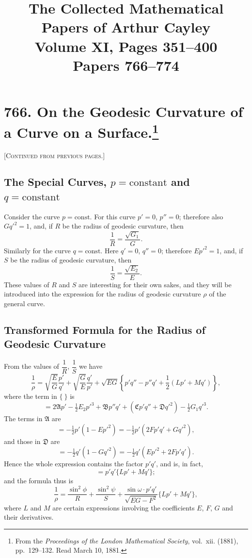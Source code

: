 \documentclass[11pt,a4paper]{article}
\title{\textbf{The Collected Mathematical Papers of Arthur Cayley}\\[6pt]
\large Volume XI, Pages 351--400\\[4pt]
\normalsize Papers 766--774}
\author{}
\date{}
\theoremstyle{definition}
\begin{document}
\maketitle
\thispagestyle{empty}

\tableofcontents
\newpage

\section[On the Geodesic Curvature of a Curve on a Surface]{766. On the Geodesic Curvature of a Curve on a Surface.\footnote{From the \textit{Proceedings of the London Mathematical Society}, vol.~xii. (1881), pp.~129--132. Read March 10, 1881.}}

\noindent\textsc{[Continued from previous pages.]}

\subsection*{The Special Curves, $p = \text{constant}$ and $q = \text{constant}$}

Consider the curve $p = \text{const}$. For this curve $p' = 0$, $p'' = 0$; therefore also $Gq'^2 = 1$, and, if $R$ be the radius of geodesic curvature, then
\[
\frac{1}{R} = \frac{\sqrt{G_1}}{G}.
\]
Similarly for the curve $q = \text{const}$. Here $q' = 0$, $q'' = 0$; therefore $Ep'^2 = 1$, and, if $S$ be the radius of geodesic curvature, then
\[
\frac{1}{S} = \frac{\sqrt{E_2}}{E}.
\]
These values of $R$ and $S$ are interesting for their own sakes, and they will be introduced into the expression for the radius of geodesic curvature $\rho$ of the general curve.

\subsection*{Transformed Formula for the Radius of Geodesic Curvature}

From the values of $\dfrac{1}{R}$, $\dfrac{1}{S}$ we have
\[
\frac{1}{\rho} = \sqrt{\frac{E}{G}} \frac{p'}{q'} + \sqrt{\frac{G}{E}} \frac{q'}{p'} + \sqrt{EG} \left\{ p'q'' - p''q' + \frac{1}{2}(Lp' + Mq') \right\},
\]
where the term in $\{\ \}$ is
\[
= 2\mathfrak{A}p' - \tfrac{1}{2}E_2 p'^3 + \mathfrak{B}p''q' + (\mathfrak{C}p'q'' + \mathfrak{D}q'^2) - \tfrac{1}{2}G_1 q'^3.
\]
The terms in $\mathfrak{A}$ are
\[
= -\tfrac{1}{2}p'(1 - Ep'^2) = -\tfrac{1}{2}p'(2Fp'q' + Gq'^2),
\]
and those in $\mathfrak{D}$ are
\[
= -\tfrac{1}{2}q'(1 - Gq'^2) = -\tfrac{1}{2}q'(Ep'^2 + 2Fp'q').
\]
Hence the whole expression contains the factor $p'q'$, and is, in fact,
\[
= p'q'\{Lp' + Mq'\};
\]
and the formula thus is
\[
\frac{1}{\rho} = \frac{\sin^2\phi}{R} + \frac{\sin^2\psi}{S} + \frac{\sin\omega \cdot p'q'}{\sqrt{EG - F^2}}\{Lp' + Mq'\},
\]
where $L$ and $M$ are certain expressions involving the coefficients $E$, $F$, $G$ and their derivatives.
\end{document}
